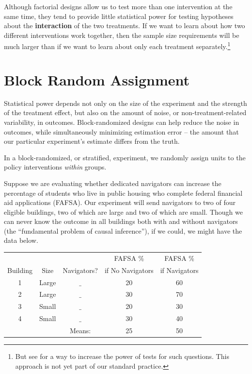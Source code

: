 \documentclass[
  12pt,
]{book}
\theoremstyle{definition}
\theoremstyle{definition}
\theoremstyle{definition}
\theoremstyle{remark}
\begin{document}
Although factorial designs allow us to test more than one intervention
at the same time, they tend to provide little statistical power for
testing hypotheses about the \textbf{interaction} of the two treatments.
If we want to learn about how two different interventions work together,
then the sample size requirements will be much larger than if we want to
learn about only each treatment separately.\footnote{But see
  \citet{small2011structured} for a way to increase the power of tests
  for such questions. This approach is not yet part of our standard
  practice.}

\hypertarget{block-random-assignment}{%
\section{Block Random Assignment}\label{block-random-assignment}}

Statistical power depends not only on the size of the experiment and the
strength of the treatment effect, but also on the amount of noise, or
non-treatment-related variability, in outcomes. Block-randomized designs
can help reduce the noise in outcomes, while simultaneously minimizing
estimation error -- the amount that our particular experiment's estimate
differs from the truth.

In a block-randomized, or stratified, experiment, we randomly assign
units to the policy interventions \emph{within} groups.

Suppose we are evaluating whether dedicated navigators can increase the
percentage of students who live in public housing who complete federal
financial aid applications (FAFSA). Our experiment will send navigators
to two of four eligible buildings, two of which are large and two of
which are small. Though we can never know the outcome in all buildings
both with and without navigators (the ``fundamental problem of causal
inference''), if we could, we might have the data below.

\begin{center}
\begin{tabular}{ccccc}
&&& FAFSA \% & FAFSA \% \\
Building & Size & Navigators? & if No Navigators & if Navigators   \\ \hline
1 & Large & $\_$ & 20 & 60 \\
2 & Large & $\_$ & 30 & 70 \\
3 & Small & $\_$ & 20 & 30 \\
4 & Small & $\_$ & 30 & 40 \\ \hline
&& Means: & 25 & 50 \\
\end{tabular}
\end{center}
\end{document}
